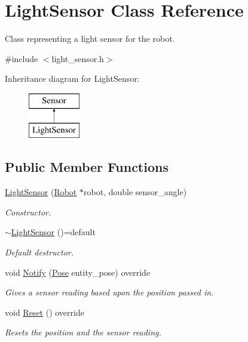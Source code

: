 \hypertarget{class_light_sensor}{}\section{Light\+Sensor Class Reference}
\label{class_light_sensor}


Class representing a light sensor for the robot.  




{\ttfamily \#include $<$light\+\_\+sensor.\+h$>$}

Inheritance diagram for Light\+Sensor\+:\begin{figure}[H]
\begin{center}
\leavevmode
\includegraphics[height=2.000000cm]{class_light_sensor}
\end{center}
\end{figure}
\subsection*{Public Member Functions}
\begin{DoxyCompactItemize}
\item 
\mbox{\hyperlink{class_light_sensor_ab2d2e9a3c5051d283eeee95dca6c582f}{Light\+Sensor}} (\mbox{\hyperlink{class_robot}{Robot}} $\ast$robot, double sensor\+\_\+angle)
\begin{DoxyCompactList}\small\item\em Constructor. \end{DoxyCompactList}\item 
\mbox{\label{class_light_sensor_a1d226e9f15af1b7245f7a2a057f8ea9c}} 
\mbox{\hyperlink{class_light_sensor_a1d226e9f15af1b7245f7a2a057f8ea9c}{$\sim$\+Light\+Sensor}} ()=default
\begin{DoxyCompactList}\small\item\em Default destructor. \end{DoxyCompactList}\item 
void \mbox{\hyperlink{class_light_sensor_ad03aaaf3b16b583ca5b5851d9887d078}{Notify}} (\mbox{\hyperlink{struct_pose}{Pose}} entity\+\_\+pose) override
\begin{DoxyCompactList}\small\item\em Gives a sensor reading based upon the position passed in. \end{DoxyCompactList}\item 
\mbox{\label{class_light_sensor_a8b8643f10dc619dd8f31ab87034a04f6}} 
void \mbox{\hyperlink{class_light_sensor_a8b8643f10dc619dd8f31ab87034a04f6}{Reset}} () override
\begin{DoxyCompactList}\small\item\em Resets the position and the sensor reading. \end{DoxyCompactList}\end{DoxyCompactItemize}
